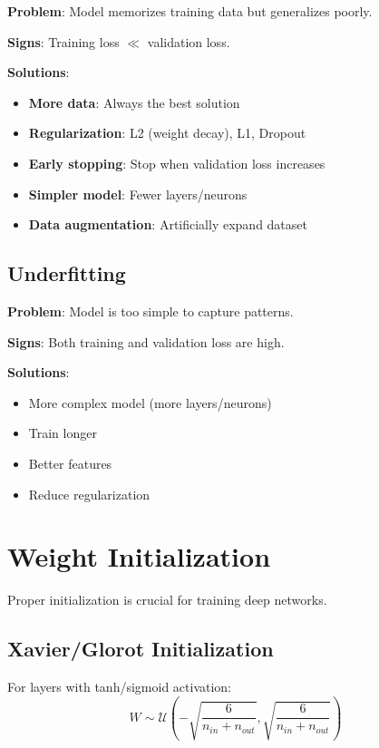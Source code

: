 \textbf{Problem}: Model memorizes training data but generalizes poorly.

\textbf{Signs}: Training loss $\ll$ validation loss.

\textbf{Solutions}:
\begin{itemize}
    \item \textbf{More data}: Always the best solution
    \item \textbf{Regularization}: L2 (weight decay), L1, Dropout
    \item \textbf{Early stopping}: Stop when validation loss increases
    \item \textbf{Simpler model}: Fewer layers/neurons
    \item \textbf{Data augmentation}: Artificially expand dataset
\end{itemize}

\subsection{Underfitting}

\textbf{Problem}: Model is too simple to capture patterns.

\textbf{Signs}: Both training and validation loss are high.

\textbf{Solutions}:
\begin{itemize}
    \item More complex model (more layers/neurons)
    \item Train longer
    \item Better features
    \item Reduce regularization
\end{itemize}

\section{Weight Initialization}

Proper initialization is crucial for training deep networks.

\subsection{Xavier/Glorot Initialization}

For layers with tanh/sigmoid activation:
\[
W \sim \mathcal{U}\left(-\sqrt{\frac{6}{n_{in} + n_{out}}}, \sqrt{\frac{6}{n_{in} + n_{out}}}\right)
\]

